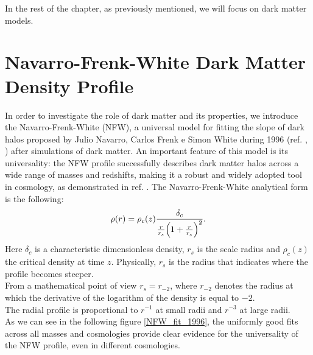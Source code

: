 In the rest of the chapter, as previously mentioned, we will focus on dark matter models.

\section{Navarro-Frenk-White Dark Matter Density Profile}

In order to investigate the role of dark matter and its properties, we introduce the Navarro-Frenk-White (NFW), a universal model for fitting the slope of dark halos proposed by Julio Navarro, Carlos Frenk e Simon White during 1996 (ref. \cite{Navarro_1996}, \cite{Navarro_1997}) after simulations of dark matter. An important feature of this model is its universality: the NFW profile successfully describes dark matter halos across a wide range of masses and redshifts, making it a robust and widely adopted tool in cosmology, as demonstrated in ref. \cite{Navarro_1997}.
The Navarro-Frenk-White analytical form is the following:
\begin{equation}\label{NFW}
    \rho (r) = \rho_c(z) \frac{\delta_c}{\frac{r}{r_s} \qty (1+\frac{r}{r_s})^2}.
\end{equation}
Here $\delta_c$ is a characteristic dimensionless density, $r_s$ is the scale radius and $\rho_c(z)$ the critical density at time $z$.
Physically, $r_s$ is the radius that indicates where the profile becomes steeper.\\ From a mathematical point of view $r_s = r_{-2}$, where $r_{-2}$ denotes the radius at which the derivative of the logarithm of the density is equal to $-2$.\\
The radial profile is proportional to $r^{-1}$ at small radii and $r^{-3}$ at large radii.\\
As we can see in the following figure \ref{NFW_fit_1996}, the uniformly good fits across all masses and cosmologies provide clear evidence for the universality of the NFW profile, even in different cosmologies.

